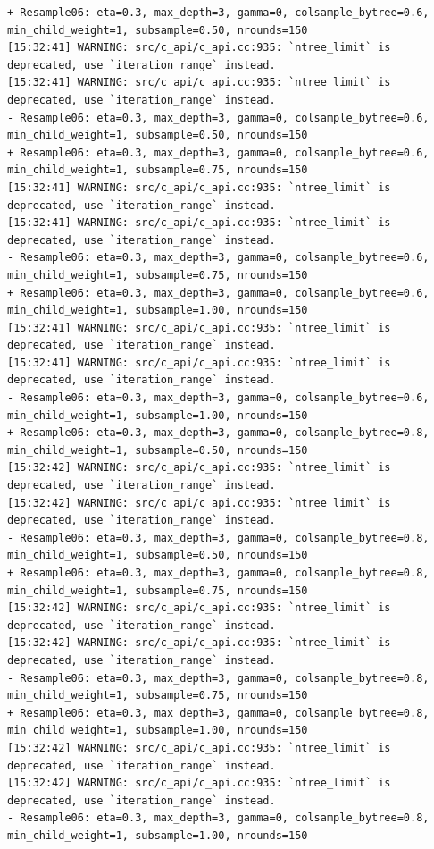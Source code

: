 \documentclass[
  letterpaper,
  DIV=11,
  numbers=noendperiod]{scrartcl}
\begin{document}
\begin{verbatim}
+ Resample06: eta=0.3, max_depth=3, gamma=0, colsample_bytree=0.6, min_child_weight=1, subsample=0.50, nrounds=150 
[15:32:41] WARNING: src/c_api/c_api.cc:935: `ntree_limit` is deprecated, use `iteration_range` instead.
[15:32:41] WARNING: src/c_api/c_api.cc:935: `ntree_limit` is deprecated, use `iteration_range` instead.
- Resample06: eta=0.3, max_depth=3, gamma=0, colsample_bytree=0.6, min_child_weight=1, subsample=0.50, nrounds=150 
+ Resample06: eta=0.3, max_depth=3, gamma=0, colsample_bytree=0.6, min_child_weight=1, subsample=0.75, nrounds=150 
[15:32:41] WARNING: src/c_api/c_api.cc:935: `ntree_limit` is deprecated, use `iteration_range` instead.
[15:32:41] WARNING: src/c_api/c_api.cc:935: `ntree_limit` is deprecated, use `iteration_range` instead.
- Resample06: eta=0.3, max_depth=3, gamma=0, colsample_bytree=0.6, min_child_weight=1, subsample=0.75, nrounds=150 
+ Resample06: eta=0.3, max_depth=3, gamma=0, colsample_bytree=0.6, min_child_weight=1, subsample=1.00, nrounds=150 
[15:32:41] WARNING: src/c_api/c_api.cc:935: `ntree_limit` is deprecated, use `iteration_range` instead.
[15:32:41] WARNING: src/c_api/c_api.cc:935: `ntree_limit` is deprecated, use `iteration_range` instead.
- Resample06: eta=0.3, max_depth=3, gamma=0, colsample_bytree=0.6, min_child_weight=1, subsample=1.00, nrounds=150 
+ Resample06: eta=0.3, max_depth=3, gamma=0, colsample_bytree=0.8, min_child_weight=1, subsample=0.50, nrounds=150 
[15:32:42] WARNING: src/c_api/c_api.cc:935: `ntree_limit` is deprecated, use `iteration_range` instead.
[15:32:42] WARNING: src/c_api/c_api.cc:935: `ntree_limit` is deprecated, use `iteration_range` instead.
- Resample06: eta=0.3, max_depth=3, gamma=0, colsample_bytree=0.8, min_child_weight=1, subsample=0.50, nrounds=150 
+ Resample06: eta=0.3, max_depth=3, gamma=0, colsample_bytree=0.8, min_child_weight=1, subsample=0.75, nrounds=150 
[15:32:42] WARNING: src/c_api/c_api.cc:935: `ntree_limit` is deprecated, use `iteration_range` instead.
[15:32:42] WARNING: src/c_api/c_api.cc:935: `ntree_limit` is deprecated, use `iteration_range` instead.
- Resample06: eta=0.3, max_depth=3, gamma=0, colsample_bytree=0.8, min_child_weight=1, subsample=0.75, nrounds=150 
+ Resample06: eta=0.3, max_depth=3, gamma=0, colsample_bytree=0.8, min_child_weight=1, subsample=1.00, nrounds=150 
[15:32:42] WARNING: src/c_api/c_api.cc:935: `ntree_limit` is deprecated, use `iteration_range` instead.
[15:32:42] WARNING: src/c_api/c_api.cc:935: `ntree_limit` is deprecated, use `iteration_range` instead.
- Resample06: eta=0.3, max_depth=3, gamma=0, colsample_bytree=0.8, min_child_weight=1, subsample=1.00, nrounds=150 

\end{verbatim}
\end{document}
